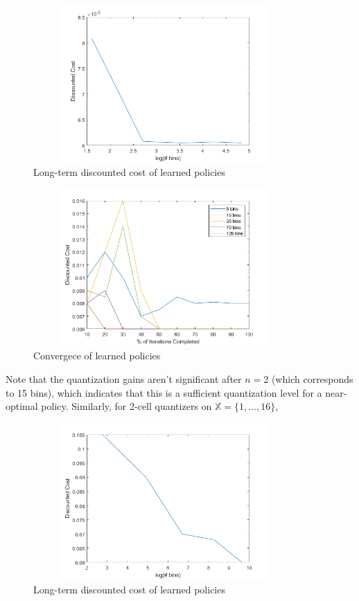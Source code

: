 \documentclass{article}
\begin{document}
\begin{figure}[H]
    \centering
    \includegraphics[height=6cm, width=10cm]{cost_5.png}
    \caption{Long-term discounted cost of learned policies}
\end{figure}

\begin{figure}[H]
    \centering
    \includegraphics[height=6cm, width=10cm]{convergence_5.png}
    \caption{Convergece of learned policies}
\end{figure}

Note that the quantization gains aren't significant after \( n=2 \) (which corresponds to 15 bins), which indicates that this is a sufficient quantization level for a near-optimal policy.
\newpage
Similarly, for 2-cell quantizers on \( \mathbb{X} = \{1,\ldots,16\} \),

\begin{figure}[H]
    \centering
    \includegraphics[height=6cm, width=10cm]{cost_16.png}
    \caption{Long-term discounted cost of learned policies}
\end{figure}
\end{document}
